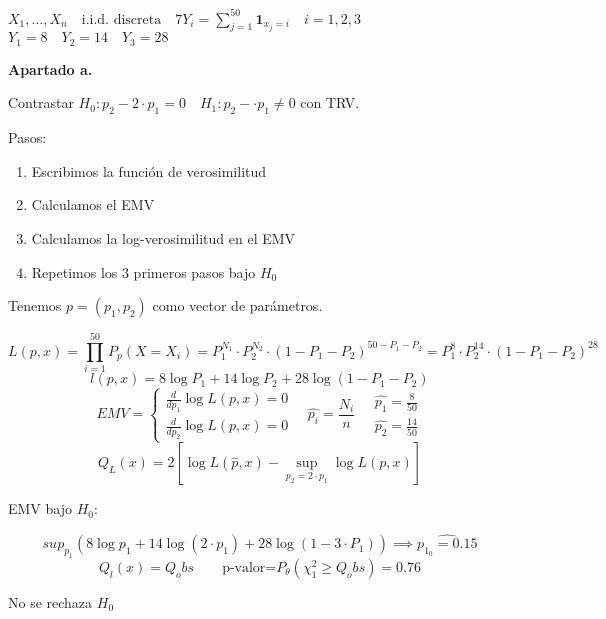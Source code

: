 \(
X_1,\dots,X_n \quad \text{i.i.d. discreta} \quad 7
Y_i=\sum_{j=1}^{50} \mathbf{1}_{x_j=i} \quad i=1,2,3
\)
\(
Y_1=8 \quad Y_2=14 \quad Y_3=28
\)

\textbf{Apartado a.}

Contrastar $H_0: p_2-2\cdot p_1=0 \quad H_1: p_2-\cdot p_1 \neq 0$
con TRV.

Pasos:
\begin{enumerate}
    \item Escribimos la función de verosimilitud
    \item Calculamos el EMV
    \item Calculamos la log-verosimilitud en el EMV
    \item Repetimos los 3 primeros pasos bajo $H_0$
\end{enumerate}

Tenemos $p=(p_1,p_2)$ como vector de parámetros.

\[
L(p,x)=\prod_{i=1}^{50} P_p(X=X_i)=P_1^{N_1}\cdot P_2^{N_2}\cdot (1-P_1-P_2)^{50-P_1-P_2}=P_1^8\cdot P_2^{14} \cdot (1-P_1-P_2)^{28}
\]
\[
l(p,x)=8 \log P_1 +14 \log P_2 +28 \log (1-P_1-P_2)
\]
\[
EMV=\left\{
\begin{array}{l}
    \frac{d}{d p_1} \log L(p,x)=0\\
    \frac{d}{d p_2} \log L(p,x)=0
\end{array}
\right.
\quad \hat{p_i}=\frac{N_i}{n}
\quad
\begin{matrix}
    \hat{p_1}=\frac{8}{50}\\
    \hat{p_2}=\frac{14}{50}
\end{matrix}
\]
\[
Q_L(x)=2[\log L(\hat{p},x)-\sup_{p_2=2\cdot p_1}\log L(p,x)]
\]

EMV bajo $H_0$:

\[
sup_{p_1}(8 \log p_1 +14 \log(2\cdot p_1)+28 \log(1-3\cdot P_1))\implies \hat{p_{1_0}=0.15}
\]
\[
Q_l(x)=Q_obs \qquad \text{p-valor=}P_\theta(\chi^2_1 \geq Q_obs)=0.76
\]

No se rechaza $H_0$



